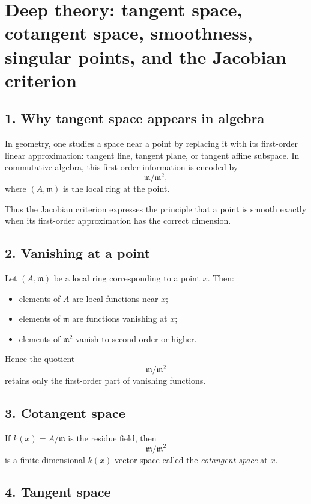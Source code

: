 \documentclass[12pt,a4paper]{article}
\theoremstyle{plain}
\theoremstyle{definition}      %
\begin{document}
	
	\section*{Deep theory: tangent space, cotangent space, smoothness, singular points, and the Jacobian criterion}
	
	\subsection*{1. Why tangent space appears in algebra}
	
	In geometry, one studies a space near a point by replacing it with its first-order linear approximation: tangent line, tangent plane, or tangent affine subspace. In commutative algebra, this first-order information is encoded by
	\[
	\mathfrak m/\mathfrak m^2,
	\]
	where \((A,\mathfrak m)\) is the local ring at the point.
	
	Thus the Jacobian criterion expresses the principle that a point is smooth exactly when its first-order approximation has the correct dimension.
	
	\subsection*{2. Vanishing at a point}
	
	Let \((A,\mathfrak m)\) be a local ring corresponding to a point \(x\). Then:
	\begin{itemize}
		\item elements of \(A\) are local functions near \(x\);
		\item elements of \(\mathfrak m\) are functions vanishing at \(x\);
		\item elements of \(\mathfrak m^2\) vanish to second order or higher.
	\end{itemize}
	Hence the quotient
	\[
	\mathfrak m/\mathfrak m^2
	\]
	retains only the first-order part of vanishing functions.
	
	\subsection*{3. Cotangent space}
	
	If \(k(x)=A/\mathfrak m\) is the residue field, then
	\[
	\mathfrak m/\mathfrak m^2
	\]
	is a finite-dimensional \(k(x)\)-vector space called the \emph{cotangent space} at \(x\).
	
	\subsection*{4. Tangent space}
	
\end{document}
